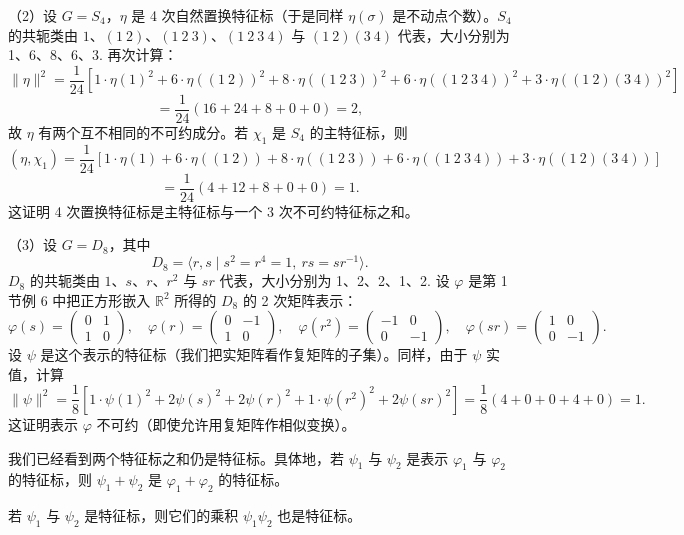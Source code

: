 （2）设 \(G = S_4\)，\(\eta\) 是 4 次自然置换特征标（于是同样 \(\eta(\sigma)\) 是不动点个数）。\(S_4\) 的共轭类由 \(1\)、\((1\ 2)\)、\((1\ 2\ 3)\)、\((1\ 2\ 3\ 4)\) 与 \((1\ 2)(3\ 4)\) 代表，大小分别为 1、6、8、6、3. 再次计算：
\[
\|\eta\|^2 = \frac{1}{24}\left[1\cdot\eta(1)^2+6\cdot\eta((1\ 2))^2+8\cdot\eta((1\ 2\ 3))^2+6\cdot\eta((1\ 2\ 3\ 4))^2+3\cdot\eta((1\ 2)(3\ 4))^2\right]
\]
\[
= \frac{1}{24}(16+24+8+0+0) = 2,
\]
故 \(\eta\) 有两个互不相同的不可约成分。若 \(\chi_1\) 是 \(S_4\) 的主特征标，则
\[
(\eta, \chi_1) = \frac{1}{24}\left[1\cdot\eta(1)+6\cdot\eta((1\ 2))+8\cdot\eta((1\ 2\ 3))+6\cdot\eta((1\ 2\ 3\ 4))+3\cdot\eta((1\ 2)(3\ 4))\right]
\]
\[
= \frac{1}{24}(4+12+8+0+0) = 1.
\]
这证明 4 次置换特征标是主特征标与一个 3 次不可约特征标之和。

（3）设 \(G = D_8\)，其中
\[
D_8 = \langle r, s \mid s^2 = r^4 = 1,\ rs = sr^{-1}\rangle.
\]
\(D_8\) 的共轭类由 \(1\)、\(s\)、\(r\)、\(r^2\) 与 \(sr\) 代表，大小分别为 1、2、2、1、2. 设 \(\varphi\) 是第 1 节例 6 中把正方形嵌入 \(\mathbb{R}^2\) 所得的 \(D_8\) 的 2 次矩阵表示：
\[
\varphi(s) = \begin{pmatrix}0 & 1\\ 1 & 0\end{pmatrix}, \quad \varphi(r) = \begin{pmatrix}0 & -1\\ 1 & 0\end{pmatrix}, \quad \varphi(r^2) = \begin{pmatrix}-1 & 0\\ 0 & -1\end{pmatrix}, \quad \varphi(sr) = \begin{pmatrix}1 & 0\\ 0 & -1\end{pmatrix}.
\]
设 \(\psi\) 是这个表示的特征标（我们把实矩阵看作复矩阵的子集）。同样，由于 \(\psi\) 实值，计算
\[
\|\psi\|^2 = \frac{1}{8}\left[1\cdot\psi(1)^2+2\psi(s)^2+2\psi(r)^2+1\cdot\psi(r^2)^2+2\psi(sr)^2\right] = \frac{1}{8}(4+0+0+4+0) = 1.
\]
这证明表示 \(\varphi\) 不可约（即使允许用复矩阵作相似变换）。

我们已经看到两个特征标之和仍是特征标。具体地，若 \(\psi_1\) 与 \(\psi_2\) 是表示 \(\varphi_1\) 与 \(\varphi_2\) 的特征标，则 \(\psi_1+\psi_2\) 是 \(\varphi_1+\varphi_2\) 的特征标。

\begin{proposition}\label{pro:18.17}
若 \(\psi_1\) 与 \(\psi_2\) 是特征标，则它们的乘积 \(\psi_1\psi_2\) 也是特征标。
\end{proposition}

